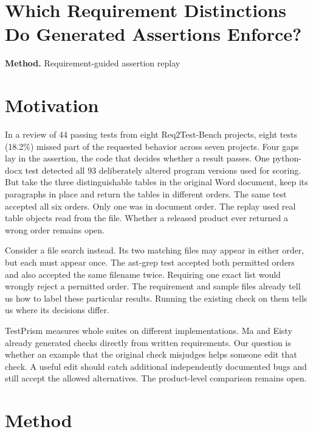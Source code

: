 \documentclass[10pt,a4paper]{article}
\begin{document}
\section*{Which Requirement Distinctions Do Generated Assertions Enforce?}
\textbf{Method.} Requirement-guided assertion replay
\section*{Motivation}
In a review of 44 passing tests from eight Req2Test-Bench projects, eight tests (18.2\%) missed part of the requested behavior across seven projects. Four gaps lay in the assertion, the code that decides whether a result passes. One python-docx test detected all 93 deliberately altered program versions used for scoring. But take the three distinguishable tables in the original Word document, keep its paragraphs in place and return the tables in different orders. The same test accepted all six orders. Only one was in document order. The replay used real table objects read from the file. Whether a released product ever returned a wrong order remains open.

Consider a file search instead. Its two matching files may appear in either order, but each must appear once. The ast-grep test accepted both permitted orders and also accepted the same filename twice. Requiring one exact list would wrongly reject a permitted order. The requirement and sample files already tell us how to label these particular results. Running the existing check on them tells us where its decisions differ.

TestPrism measures whole suites on different implementations. Ma and Eisty already generated checks directly from written requirements. Our question is whether an example that the original check misjudges helps someone edit that check. A useful edit should catch additional independently documented bugs and still accept the allowed alternatives. The product-level comparison remains open.
\section*{Method}
\end{document}
